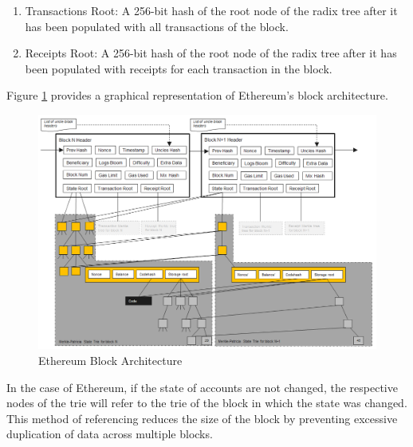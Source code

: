 \documentclass[a4paper,12pt]{article}
\begin{document}
{{\begin{enumerate}
		\item Transactions Root: A 256-bit hash of the root node of the radix tree after it has been populated with all transactions of the block.
		\item Receipts Root: A 256-bit hash of the root node of the radix tree after it has been populated with receipts for each transaction in the block.
	\end{enumerate} 
Figure \ref{fig:ethblkstruct} provides a graphical representation of Ethereum's block architecture.}
\begin{figure}[H]
	\centering
	\includegraphics[width=1\linewidth]{ethereumblkstruct}
	\caption[Ethereum Block Architecture]{Ethereum Block Architecture \cite{ethblkarc}}
	\label{fig:ethblkstruct}
\end{figure}
\noindent In the case of Ethereum, if the state of accounts are not changed, the respective nodes of the trie will refer to the trie of the block in which the state was changed. This method of referencing reduces the size of the block by preventing excessive duplication of data across multiple blocks.
}
\end{document}
